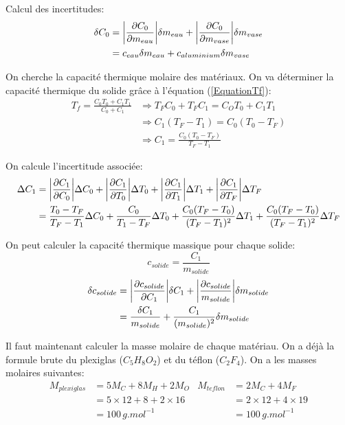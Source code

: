 \documentclass[12pt]{article}
\begin{document}
Calcul des incertitudes:
\begin{align*}
\delta C_0&= \abs{\frac{\partial C_0}{\partial m_{eau}}} \delta m_{eau} + \abs{\frac{\partial C_0}{\partial m_{vase}}} \delta m_{vase}\\
&=c_{eau}\delta m_{eau}+c_{aluminium}\delta m_{vase}
\end{align*}

On cherche la capacité thermique molaire des matériaux. On va déterminer la capacité thermique du solide grâce à l'équation (\ref{EquationTf}):
\begin{align*}
T_f=\frac{C_0T_0+C_1T_1}{C_0+C_1} &\Rightarrow T_FC_0+T_FC_1=C_OT_0+C_1T_1 \\
&\Rightarrow C_1(T_F-T_1)=C_0(T_0-T_F) \\
&\Rightarrow C_1=\frac{C_0(T_0-T_F)}{T_F-T_1}
\end{align*}

On calcule l'incertitude associée:
\begin{align*}
\Delta C_1 &= \abs{\frac{\partial C_1}{\partial C_0}} \Delta C_0 + \abs{\frac{\partial C_1}{\partial T_0}} \Delta T_0 + \abs{\frac{\partial C_1}{\partial T_1}} \Delta T_1 + \abs{\frac{\partial C_1}{\partial T_F}} \Delta T_F \\
&= \frac{T_0-T_F}{T_F-T_1}\Delta C_0 + \frac{C_0}{T_1-T_F} \Delta T_0 + \frac{C_0(T_F - T_0)}{(T_F-T_1)^2}\Delta T_1 + \frac{C_0(T_F - T_0)}{(T_F-T_1)^2}\Delta T_F
\end{align*}

On peut calculer la capacité thermique massique pour chaque solide:
\begin{equation}
c_{solide}=\frac{C_1}{m_{solide}}
\end{equation}
\begin{align*}
\delta c_{solide}&=\abs{\frac{\partial c_{solide}}{\partial C_1}}\delta C_1 + \abs{\frac{\partial c_{solide}}{m_{solide}}}\delta m_{solide} \\
&=\frac{\delta C_1}{m_{solide}}+ \frac{C_1}{(m_{solide})^2}\delta m_{solide}
\end{align*}

Il faut maintenant calculer la masse molaire de chaque matériau. On a déjà la formule brute du plexiglas ($C_5H_8O_2$) et du téflon ($C_2F_4$). On a les masses molaires suivantes:
\begin{align*}
M_{plexiglas}&=5M_C+8M_H+2M_O & M_{teflon}&=2M_C+4M_F  \\
&=5\times 12+8+2\times 16 & &=2\times 12+4\times 19 \\
&=100\, g.mol^{-1} & &=100\, g.mol^{-1}
\end{align*}
\end{document}
